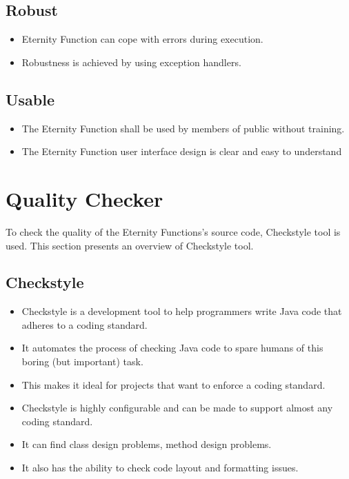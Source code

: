 \documentclass[11pt, english]{report}
\begin{document}
\subsection{Robust}

\begin{itemize}
    \item Eternity Function can cope with errors during execution.
    \item Robustness is achieved by using exception handlers.
\end{itemize}

\subsection{Usable}

\begin{itemize}
    \item The Eternity Function shall be used by members of public without training.
    \item The Eternity Function user interface design is clear and easy to understand
\end{itemize}

\section{Quality Checker}

To check the quality of the Eternity Functions's source code, Checkstyle\cite{checkstyle} tool is used. This section presents an overview of Checkstyle tool.

\subsection{Checkstyle}

\begin{itemize}
    \item Checkstyle is a development tool to help programmers write Java code that adheres to a coding standard.
    \item It automates the process of checking Java code to spare humans of this boring (but important) task.
    \item This makes it ideal for projects that want to enforce a coding standard.
    \item Checkstyle is highly configurable and can be made to support almost any coding standard.
    \item It can find class design problems, method design problems. 
    \item It also has the ability to check code layout and formatting issues.
\end{itemize}
\end{document}
